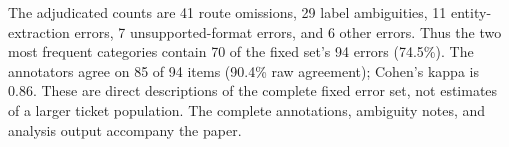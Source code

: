 The adjudicated counts are 41 route omissions, 29 label ambiguities, 11 entity-extraction errors, 7 unsupported-format errors, and 6 other errors. Thus the two most frequent categories contain 70 of the fixed set's 94 errors (74.5\%). The annotators agree on 85 of 94 items (90.4\% raw agreement); Cohen's kappa is 0.86. These are direct descriptions of the complete fixed error set, not estimates of a larger ticket population. The complete annotations, ambiguity notes, and analysis output accompany the paper.
